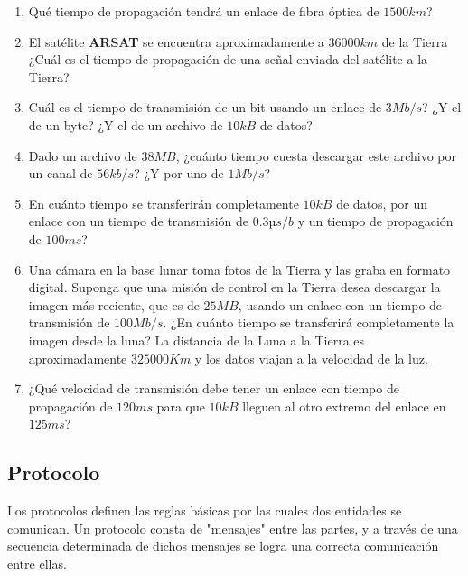 \documentclass[12pt]{article}
\begin{document}
\begin{enumerate}

    \item Qué tiempo de propagación tendrá un enlace de fibra óptica de $1500
        km$?

    \item El satélite \textbf{ARSAT} se encuentra aproximadamente a $36000 km$
        de la Tierra ¿Cuál es el tiempo de propagación de una señal enviada
        del satélite a la Tierra? 

    \item Cuál es el tiempo de transmisión de un bit usando un enlace de $3
        Mb/s$? ¿Y el de un byte? ¿Y el de un archivo de $10 kB$ de datos? 

    \item Dado un archivo de $38 MB$, ¿cuánto tiempo cuesta descargar este
        archivo por un canal de $56kb/s$? ¿Y por uno de $1Mb/s$? 

    \item En cuánto tiempo se transferirán completamente $10 kB$ de datos, por
        un enlace con un tiempo de transmisión de $0.3 µs/b$ y un tiempo de
        propagación de $100 ms$? 

    \item Una cámara en la base lunar toma fotos de la Tierra y las graba en
        formato digital. Suponga que una misión de control en la Tierra desea
        descargar la imagen más reciente, que es de $25 MB$, usando un enlace
        con un tiempo de transmisión de $100 Mb/s$. ¿En cuánto tiempo se
        transferirá completamente la imagen desde la luna? La distancia de la
        Luna a la Tierra es aproximadamente $325000 Km$ y los datos viajan a
        la velocidad de la luz.
        
    \item ¿Qué velocidad de transmisión debe tener un enlace con tiempo de
        propagación de $120 ms$ para que $10 kB$ lleguen al otro extremo del
        enlace en $125 ms$?

\end{enumerate}

\subsection*{Protocolo}

Los protocolos definen las reglas básicas por las cuales dos entidades se
comunican. Un protocolo consta de "mensajes" entre las partes, y a través de
una secuencia determinada de dichos mensajes se logra una correcta
comunicación entre ellas.
\end{document}

